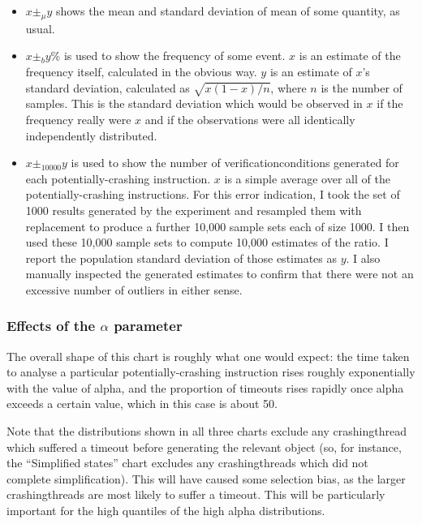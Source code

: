 \begin{itemize}
\item $x \pm_\mu y$ shows the mean and standard deviation of mean of
  some quantity, as usual.
\item $x \pm_b y$\% is used to show the frequency of some event.  $x$
  is an estimate of the frequency itself, calculated in the obvious
  way.  $y$ is an estimate of $x$'s standard deviation, calculated as
  $\sqrt{x(1-x)/n}$, where $n$ is the number of samples.  This is
  the standard deviation which would be observed in $x$ if the
  frequency really were $x$ and if the observations were all
  identically independently distributed.
\item $x \pm_{10000} y$ is used to show the number of
  \glspl{verificationcondition} generated for each
  potentially-crashing instruction.  $x$ is a simple average over all
  of the potentially-crashing instructions.  For this error
  indication, I took the set of 1000 results generated by the
  experiment and resampled them with replacement to produce a further
  10,000 sample sets each of size 1000.  I then used these 10,000
  sample sets to compute 10,000 estimates of the ratio.  I report the
  population standard deviation of those estimates as $y$.  I also
  manually inspected the generated estimates to confirm that there
  were not an excessive number of outliers in either sense.
\end{itemize}

\subsubsection{Effects of the $\alpha$ parameter}
\label{sect:eval:alpha}

The overall shape of this chart is roughly what one would expect: the
time taken to analyse a particular potentially-crashing instruction
rises roughly exponentially with the value of \gls{alpha}, and the
proportion of timeouts rises rapidly once \gls{alpha} exceeds a
certain value, which in this case is about 50.

Note that the distributions shown in all three charts exclude any
\gls{crashingthread} which suffered a timeout before generating the
relevant object (so, for instance, the ``Simplified states'' chart
excludes any \glspl{crashingthread} which did not complete
simplification).  This will have caused some selection bias, as the
larger \glspl{crashingthread} are most likely to suffer a timeout.
This will be particularly important for the high quantiles of the high
\gls{alpha} distributions.

